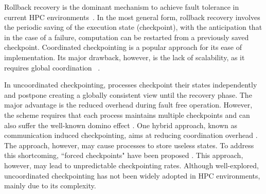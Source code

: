 Rollback recovery is the dominant mechanism to achieve fault
tolerance in current HPC environments~\cite{Elnozahy:02:Survey}. In the most general form, rollback recovery 
involves the periodic saving of the execution state (checkpoint), with the anticipation that
in the case of a failure, computation can be restarted from a previously saved checkpoint. %
Coordinated checkpointing is a popular approach for
its ease of implementation.
Its major drawback, however, is the
lack of scalability, as it requires global coordination
~\cite{elnozahy_dsc_2004}.%


In uncoordinated checkpointing, processes checkpoint their states independently and postpone creating a 
globally consistent view until the recovery phase. The major advantage is the reduced overhead during fault free operation. However, the scheme requires that
each process maintains multiple checkpoints %
and can also suffer the well-known domino effect 
 \cite{randell_domino_effect}. One hybrid approach, known as communication induced 
checkpointing, aims at reducing coordination overhead \cite{alvisi_ftc_1999}. The approach, however, may 
cause processes to store useless states. To address this 
shortcoming, ``forced checkpoints" have been proposed \cite{helary_rds_1997}. This approach, however,  may lead to unpredictable
checkpointing rates. Although well-explored, uncoordinated checkpointing has not been widely adopted
in HPC environments, mainly due to its complexity. 



